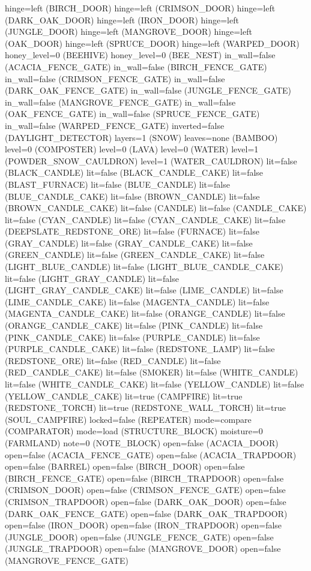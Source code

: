 \documentclass[11pt]{article}
\begin{document}
hinge=left (BIRCH_DOOR)
hinge=left (CRIMSON_DOOR)
hinge=left (DARK_OAK_DOOR)
hinge=left (IRON_DOOR)
hinge=left (JUNGLE_DOOR)
hinge=left (MANGROVE_DOOR)
hinge=left (OAK_DOOR)
hinge=left (SPRUCE_DOOR)
hinge=left (WARPED_DOOR)
honey_level=0 (BEEHIVE)
honey_level=0 (BEE_NEST)
in_wall=false (ACACIA_FENCE_GATE)
in_wall=false (BIRCH_FENCE_GATE)
in_wall=false (CRIMSON_FENCE_GATE)
in_wall=false (DARK_OAK_FENCE_GATE)
in_wall=false (JUNGLE_FENCE_GATE)
in_wall=false (MANGROVE_FENCE_GATE)
in_wall=false (OAK_FENCE_GATE)
in_wall=false (SPRUCE_FENCE_GATE)
in_wall=false (WARPED_FENCE_GATE)
inverted=false (DAYLIGHT_DETECTOR)
layers=1 (SNOW)
leaves=none (BAMBOO)
level=0 (COMPOSTER)
level=0 (LAVA)
level=0 (WATER)
level=1 (POWDER_SNOW_CAULDRON)
level=1 (WATER_CAULDRON)
lit=false (BLACK_CANDLE)
lit=false (BLACK_CANDLE_CAKE)
lit=false (BLAST_FURNACE)
lit=false (BLUE_CANDLE)
lit=false (BLUE_CANDLE_CAKE)
lit=false (BROWN_CANDLE)
lit=false (BROWN_CANDLE_CAKE)
lit=false (CANDLE)
lit=false (CANDLE_CAKE)
lit=false (CYAN_CANDLE)
lit=false (CYAN_CANDLE_CAKE)
lit=false (DEEPSLATE_REDSTONE_ORE)
lit=false (FURNACE)
lit=false (GRAY_CANDLE)
lit=false (GRAY_CANDLE_CAKE)
lit=false (GREEN_CANDLE)
lit=false (GREEN_CANDLE_CAKE)
lit=false (LIGHT_BLUE_CANDLE)
lit=false (LIGHT_BLUE_CANDLE_CAKE)
lit=false (LIGHT_GRAY_CANDLE)
lit=false (LIGHT_GRAY_CANDLE_CAKE)
lit=false (LIME_CANDLE)
lit=false (LIME_CANDLE_CAKE)
lit=false (MAGENTA_CANDLE)
lit=false (MAGENTA_CANDLE_CAKE)
lit=false (ORANGE_CANDLE)
lit=false (ORANGE_CANDLE_CAKE)
lit=false (PINK_CANDLE)
lit=false (PINK_CANDLE_CAKE)
lit=false (PURPLE_CANDLE)
lit=false (PURPLE_CANDLE_CAKE)
lit=false (REDSTONE_LAMP)
lit=false (REDSTONE_ORE)
lit=false (RED_CANDLE)
lit=false (RED_CANDLE_CAKE)
lit=false (SMOKER)
lit=false (WHITE_CANDLE)
lit=false (WHITE_CANDLE_CAKE)
lit=false (YELLOW_CANDLE)
lit=false (YELLOW_CANDLE_CAKE)
lit=true (CAMPFIRE)
lit=true (REDSTONE_TORCH)
lit=true (REDSTONE_WALL_TORCH)
lit=true (SOUL_CAMPFIRE)
locked=false (REPEATER)
mode=compare (COMPARATOR)
mode=load (STRUCTURE_BLOCK)
moisture=0 (FARMLAND)
note=0 (NOTE_BLOCK)
open=false (ACACIA_DOOR)
open=false (ACACIA_FENCE_GATE)
open=false (ACACIA_TRAPDOOR)
open=false (BARREL)
open=false (BIRCH_DOOR)
open=false (BIRCH_FENCE_GATE)
open=false (BIRCH_TRAPDOOR)
open=false (CRIMSON_DOOR)
open=false (CRIMSON_FENCE_GATE)
open=false (CRIMSON_TRAPDOOR)
open=false (DARK_OAK_DOOR)
open=false (DARK_OAK_FENCE_GATE)
open=false (DARK_OAK_TRAPDOOR)
open=false (IRON_DOOR)
open=false (IRON_TRAPDOOR)
open=false (JUNGLE_DOOR)
open=false (JUNGLE_FENCE_GATE)
open=false (JUNGLE_TRAPDOOR)
open=false (MANGROVE_DOOR)
open=false (MANGROVE_FENCE_GATE)
\end{document}
